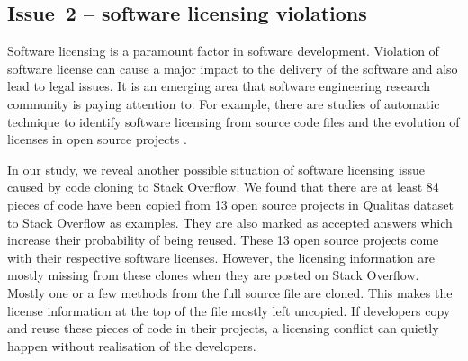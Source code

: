 \documentclass{sig-alternate-05-2015}
\begin{document}
\subsection{Issue~2 -- software licensing violations}
Software licensing is a paramount factor in software development. Violation of software license can cause a major impact to the delivery of the software and also lead to legal issues. It is an emerging area that software engineering research community is paying attention to. For example, there are studies of automatic technique to identify software licensing from source code files \cite{German2010} and the evolution of licenses in open source projects \cite{DiPenta2010}.

In our study, we reveal another possible situation of software licensing issue caused by code cloning to Stack Overflow. We found that there are at least 84 pieces of code have been copied from 13 open source projects in Qualitas dataset to Stack Overflow as examples. They are also marked as accepted answers which increase their probability of being reused. These 13 open source projects come with their respective software licenses. However, the licensing information are mostly missing from these clones when they are posted on Stack Overflow. Mostly one or a few methods from the full source file are cloned. This makes the license information at the top of the file mostly left uncopied. If developers copy and reuse these pieces of code in their projects, a licensing conflict can quietly happen without realisation of the developers. 
\end{document}
